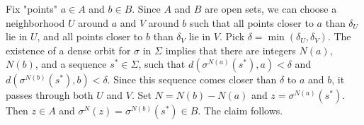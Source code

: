 \begin{solution}[7.3]
Fix "points" $a \in A$ and $b \in B$. Since $A$ and $B$ are open sets, we can choose a neighborhood $U$ around $a$ and $V$ around $b$ such that all points closer to $a$ than $\delta_U$ lie in $U$, and all points closer to $b$ than $\delta_V$ lie in $V$. Pick $\delta = \min(\delta_U, \delta_V)$. The existence of a dense orbit for $\sigma$ in $\Sigma$ implies that there are integers $N(a)$, $N(b)$, and a sequence $s^* \in \Sigma$, such that $d(\sigma^{N(a)}(s^*), a) < \delta$ and $d(\sigma^{N(b)}(s^*), b) < \delta$. Since this sequence comes closer than $\delta$ to $a$ and $b$, it passes through both $U$ and $V$. Set $N = N(b) - N(a)$ and $z = \sigma^{N(a)}(s^*)$. Then $z \in A$ and $\sigma^N(z) = \sigma^{N(b)}(s^*) \in B$. The claim follows.

%
\end{solution}


